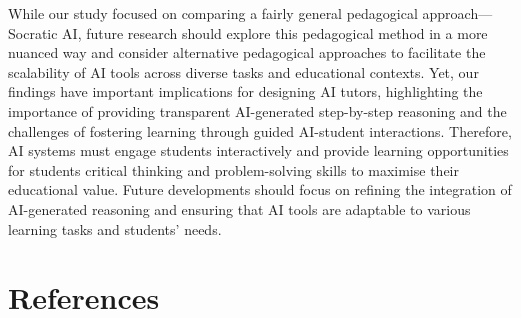 \documentclass[
  11pt,
]{article}
\begin{document}
While our study focused on comparing a fairly general pedagogical approach---Socratic AI, future research should explore this pedagogical method in a more nuanced way and consider alternative pedagogical approaches to facilitate the scalability of AI tools across diverse tasks and educational contexts. Yet, our findings have important implications for designing AI tutors, highlighting the importance of providing transparent AI-generated step-by-step reasoning and the challenges of fostering learning through guided AI-student interactions. Therefore, AI systems must engage students interactively and provide learning opportunities for students critical thinking and problem-solving skills to maximise their educational value. Future developments should focus on refining the integration of AI-generated reasoning and ensuring that AI tools are adaptable to various learning tasks and students' needs.

\section*{References}\label{references}
\end{document}
